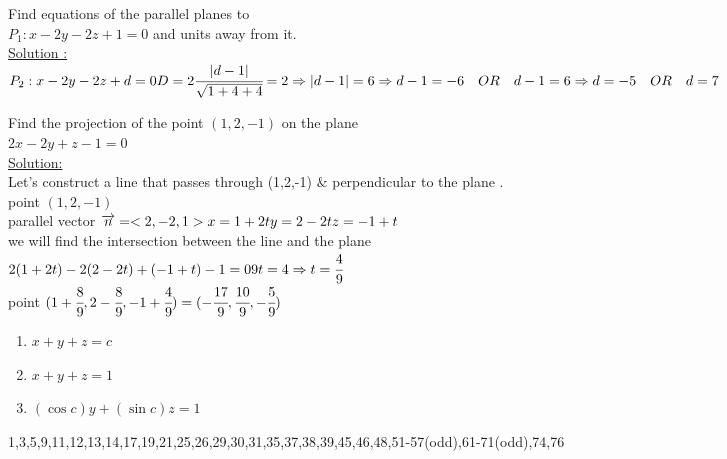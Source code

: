 \noindent{\color{smalt(darkpowderblue)}\rule{\linewidth}{.2mm}}
\begin{example}
Find equations of the parallel planes to \\ 
$P_1 : x-2y-2z+1=0 $ and units away from it.\\
{\color{smalt(darkpowderblue)}\underline{Solution :}} \\
$P_2 : x-2y-2z+d=0 \\ D=2 \\ {\cfrac{|d-1|}{\sqrt{1+4+4}} }=2\\ \Rightarrow |d-1|=6 \\
\Rightarrow  d-1 = -6 ~~~ OR~~~ d-1=6 \\
\Rightarrow d=-5 ~~~ OR ~~~ d=7$ 
\end{example}
\noindent{\color{smalt(darkpowderblue)}\rule{\linewidth}{.2mm}}
\begin{example}
Find the projection of the point
$(1,2,-1)$ on the plane \\$ 2x-2y+z-1=0 $\\
{\color{smalt(darkpowderblue)}\underline{Solution:}} \\
Let's construct a line that passes through (1,2,-1) $\&$ perpendicular to the plane .\\
point $(1,2,-1)$ \\
parallel vector $\overrightarrow{n}=<2,-2,1> \\
x=1+2t \\ 
y=2-2t \\
z=-1+t $ \\
we will find the intersection between the line and the plane \\
$2(1+2t)-2(2-2t)+(-1+t)-1=0 \\ 9t=4 \Rightarrow t=\cfrac{4}{9}$ \\
point $(1+\cfrac{8}{9} , 2-\cfrac{8}{9} , -1 + \cfrac{4}{9}) = (-\cfrac{17}{9},\cfrac{10}{9} , -\cfrac{5}{9})$
\end{example}
\noindent{\color{smalt(darkpowderblue)}\rule{\linewidth}{.2mm}}
\begin{example} 
\begin{enumerate}
    \item $x+y+z=c$
    \item $x+y+z=1$ 
    \item $(\cos{c})y+(\sin{c})z=1$
\end{enumerate} 
\end{example}
\noindent{\color{smalt(darkpowderblue)}\rule{\linewidth}{.2mm}}
\begin{problem}
1,3,5,9,11,12,13,14,17,19,21,25,26,29,30,31,35,37,38,39,45,46,48,51-57(odd),61-71(odd),74,76
\end{problem}
